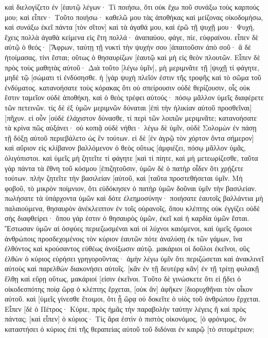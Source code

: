 καὶ διελογίζετο ἐν [ἑαυτῷ λέγων· Τί ποιήσω, ὅτι οὐκ ἔχω ποῦ συνάξω τοὺς καρπούς μου; 
καὶ εἶπεν· Τοῦτο ποιήσω· καθελῶ μου τὰς ἀποθήκας καὶ μείζονας οἰκοδομήσω, καὶ συνάξω ἐκεῖ πάντα [τὸν σῖτον] καὶ τὰ ἀγαθά μου, 
καὶ ἐρῶ τῇ ψυχῇ μου· Ψυχή, ἔχεις πολλὰ ἀγαθὰ κείμενα εἰς ἔτη πολλά· ἀναπαύου, φάγε, πίε, εὐφραίνου. 
εἶπεν δὲ αὐτῷ ὁ θεός· [Ἄφρων, ταύτῃ τῇ νυκτὶ τὴν ψυχήν σου [ἀπαιτοῦσιν ἀπὸ σοῦ· ἃ δὲ ἡτοίμασας, τίνι ἔσται; 
οὕτως ὁ θησαυρίζων [ἑαυτῷ καὶ μὴ εἰς θεὸν πλουτῶν. 
Εἶπεν δὲ πρὸς τοὺς μαθητὰς αὐτοῦ· Διὰ τοῦτο [λέγω ὑμῖν], μὴ μεριμνᾶτε τῇ [ψυχῇ τί φάγητε, μηδὲ τῷ [σώματι τί ἐνδύσησθε. 
ἡ [γὰρ ψυχὴ πλεῖόν ἐστιν τῆς τροφῆς καὶ τὸ σῶμα τοῦ ἐνδύματος. 
κατανοήσατε τοὺς κόρακας ὅτι οὐ σπείρουσιν οὐδὲ θερίζουσιν, οἷς οὐκ ἔστιν ταμεῖον οὐδὲ ἀποθήκη, καὶ ὁ θεὸς τρέφει αὐτούς· πόσῳ μᾶλλον ὑμεῖς διαφέρετε τῶν πετεινῶν. 
τίς δὲ ἐξ ὑμῶν μεριμνῶν δύναται [ἐπὶ τὴν ἡλικίαν αὐτοῦ προσθεῖναι] [πῆχυν. 
εἰ οὖν [οὐδὲ ἐλάχιστον δύνασθε, τί περὶ τῶν λοιπῶν μεριμνᾶτε; 
κατανοήσατε τὰ κρίνα πῶς αὐξάνει· οὐ κοπιᾷ οὐδὲ νήθει· λέγω δὲ ὑμῖν, οὐδὲ Σολομὼν ἐν πάσῃ τῇ δόξῃ αὐτοῦ περιεβάλετο ὡς ἓν τούτων. 
εἰ δὲ [ἐν ἀγρῷ τὸν χόρτον ὄντα σήμερον] καὶ αὔριον εἰς κλίβανον βαλλόμενον ὁ θεὸς οὕτως [ἀμφιέζει, πόσῳ μᾶλλον ὑμᾶς, ὀλιγόπιστοι. 
καὶ ὑμεῖς μὴ ζητεῖτε τί φάγητε [καὶ τί πίητε, καὶ μὴ μετεωρίζεσθε, 
ταῦτα γὰρ πάντα τὰ ἔθνη τοῦ κόσμου [ἐπιζητοῦσιν, ὑμῶν δὲ ὁ πατὴρ οἶδεν ὅτι χρῄζετε τούτων. 
πλὴν ζητεῖτε τὴν βασιλείαν [αὐτοῦ, καὶ [ταῦτα προστεθήσεται ὑμῖν. 
Μὴ φοβοῦ, τὸ μικρὸν ποίμνιον, ὅτι εὐδόκησεν ὁ πατὴρ ὑμῶν δοῦναι ὑμῖν τὴν βασιλείαν. 
πωλήσατε τὰ ὑπάρχοντα ὑμῶν καὶ δότε ἐλεημοσύνην· ποιήσατε ἑαυτοῖς βαλλάντια μὴ παλαιούμενα, θησαυρὸν ἀνέκλειπτον ἐν τοῖς οὐρανοῖς, ὅπου κλέπτης οὐκ ἐγγίζει οὐδὲ σὴς διαφθείρει· 
ὅπου γάρ ἐστιν ὁ θησαυρὸς ὑμῶν, ἐκεῖ καὶ ἡ καρδία ὑμῶν ἔσται. 
Ἔστωσαν ὑμῶν αἱ ὀσφύες περιεζωσμέναι καὶ οἱ λύχνοι καιόμενοι, 
καὶ ὑμεῖς ὅμοιοι ἀνθρώποις προσδεχομένοις τὸν κύριον ἑαυτῶν πότε ἀναλύσῃ ἐκ τῶν γάμων, ἵνα ἐλθόντος καὶ κρούσαντος εὐθέως ἀνοίξωσιν αὐτῷ. 
μακάριοι οἱ δοῦλοι ἐκεῖνοι, οὓς ἐλθὼν ὁ κύριος εὑρήσει γρηγοροῦντας· ἀμὴν λέγω ὑμῖν ὅτι περιζώσεται καὶ ἀνακλινεῖ αὐτοὺς καὶ παρελθὼν διακονήσει αὐτοῖς. 
[κἂν ἐν τῇ δευτέρᾳ κἂν] ἐν τῇ τρίτῃ φυλακῇ ἔλθῃ καὶ εὕρῃ οὕτως, μακάριοί [εἰσιν ἐκεῖνοι. 
Τοῦτο δὲ γινώσκετε ὅτι εἰ ᾔδει ὁ οἰκοδεσπότης ποίᾳ ὥρᾳ ὁ κλέπτης ἔρχεται, [οὐκ ἂν] ἀφῆκεν [διορυχθῆναι τὸν οἶκον αὐτοῦ. 
καὶ [ὑμεῖς γίνεσθε ἕτοιμοι, ὅτι ᾗ ὥρᾳ οὐ δοκεῖτε ὁ υἱὸς τοῦ ἀνθρώπου ἔρχεται. 
Εἶπεν [δὲ ὁ Πέτρος· Κύριε, πρὸς ἡμᾶς τὴν παραβολὴν ταύτην λέγεις ἢ καὶ πρὸς πάντας; 
[καὶ εἶπεν] ὁ κύριος· Τίς ἄρα ἐστὶν ὁ πιστὸς οἰκονόμος, [ὁ φρόνιμος, ὃν καταστήσει ὁ κύριος ἐπὶ τῆς θεραπείας αὐτοῦ τοῦ διδόναι ἐν καιρῷ [τὸ σιτομέτριον; 
